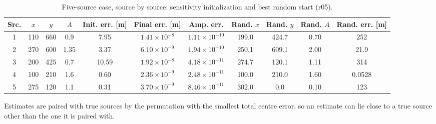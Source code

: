 \begin{table}[htbp]
\centering
\caption{Five-source case, source by source: sensitivity initialization and best random start (r05).}
\label{tab:table_budget_sources}
\footnotesize
\begin{tabular}{ccccccccccc}
\toprule
Src. & $x$ & $y$ & $A$ & Init. err. [m] & Final err. [m] & Amp. err. & Rand. $x$ & Rand. $y$ & Rand. $A$ & Rand. err. [m] \\
\midrule
1 & 110 & 660 & 0.9 & 7.95 & $1.41\times 10^{-8}$ & $1.11\times 10^{-10}$ & 199.0 & 424.7 & 0.70 & 252 \\
2 & 270 & 600 & 1.35 & 3.37 & $6.10\times 10^{-9}$ & $1.94\times 10^{-10}$ & 250.1 & 609.1 & 2.00 & 21.9 \\
3 & 200 & 425 & 0.7 & 10.59 & $1.92\times 10^{-8}$ & $4.18\times 10^{-11}$ & 274.7 & 120.1 & 1.11 & 314 \\
4 & 100 & 210 & 1.6 & 0.60 & $2.36\times 10^{-9}$ & $2.48\times 10^{-11}$ & 100.0 & 210.0 & 1.60 & 0.0528 \\
5 & 275 & 120 & 1.1 & 0.31 & $3.70\times 10^{-9}$ & $8.46\times 10^{-11}$ & 302.0 & 0.0 & 0.10 & 123 \\
\bottomrule
\end{tabular}
\par\smallskip
\parbox{0.92\linewidth}{\scriptsize Estimates are paired with true sources by the permutation with the smallest total centre error, so an estimate can lie close to a true source other than the one it is paired with.}
\end{table}

